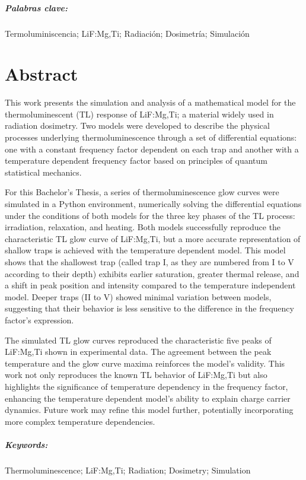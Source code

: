 \paragraph{Palabras clave:} Termoluminiscencia; LiF:Mg,Ti; Radiación; Dosimetría; Simulación









\chapter*{Abstract}

This work presents the simulation and analysis of a mathematical model for the thermoluminescent (TL) response of LiF:Mg,Ti; a material widely used in radiation dosimetry. Two models were developed to describe the physical processes underlying thermoluminescence through a set of differential equations: one with a constant frequency factor dependent on each trap and another with a temperature dependent frequency factor based on principles of quantum statistical mechanics.

\vspace{10pt}

For this Bachelor's Thesis, a series of thermoluminescence glow curves were simulated in a Python environment, numerically solving the differential equations under the conditions of both models for the three key phases of the TL process: irradiation, relaxation, and heating. Both models successfully reproduce the characteristic TL glow curve of LiF:Mg,Ti, but a more accurate representation of shallow traps is achieved with the temperature dependent model. This model shows that the shallowest trap (called trap I, as they are numbered from I to V according to their depth) exhibits earlier saturation, greater thermal release, and a shift in peak position and intensity compared to the temperature independent model. Deeper traps (II to V) showed minimal variation between models, suggesting that their behavior is less sensitive to the difference in the frequency factor's expression.

\vspace{10pt}

The simulated TL glow curves reproduced the characteristic five peaks of LiF:Mg,Ti shown in experimental data. The agreement between the peak temperature and the glow curve maxima reinforces the model's validity. This work not only reproduces the known TL behavior of LiF:Mg,Ti but also highlights the significance of temperature dependency in the frequency factor, enhancing the temperature dependent model's ability to explain charge carrier dynamics. Future work may refine this model further, potentially incorporating more complex temperature dependencies.

\paragraph{Keywords:} Thermoluminescence; LiF:Mg,Ti; Radiation; Dosimetry; Simulation
